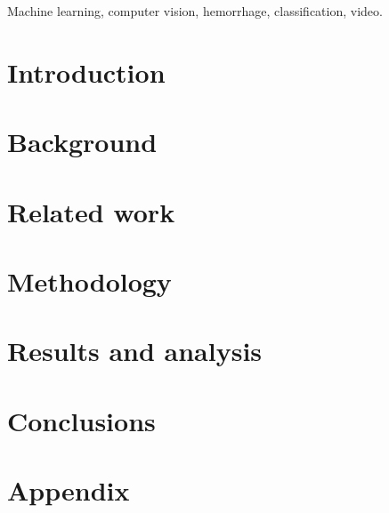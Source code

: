 \documentclass[conference]{IEEEtran}
\begin{document}


\begin{abstract}

\end{abstract}

\begin{IEEEkeywords}
    Machine learning, computer vision, hemorrhage, classification, video.
\end{IEEEkeywords}

\section{Introduction}


\section{Background}


\section{Related work}


\section{Methodology}


\section{Results and analysis}


\section{Conclusions}





\newpage
\section{Appendix}

\end{document}
